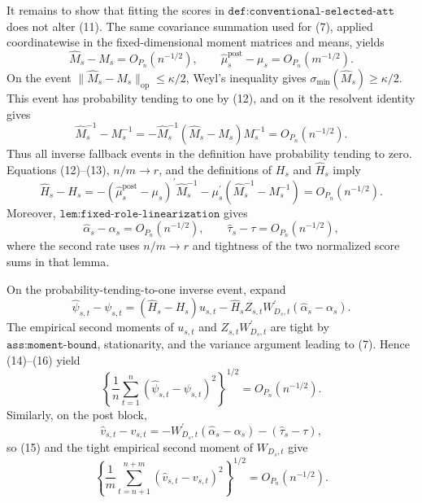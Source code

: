 It remains to show that fitting the scores in \(\texttt{def:conventional-selected-att}\) does not alter (11).  The same covariance summation used for (7), applied coordinatewise in the fixed-dimensional moment matrices and means, yields
\[
 \widehat M_s-M_s=O_{P_n}(n^{-1/2}),
 \qquad
 \widehat\mu_s^{\mathrm{post}}-\mu_s=O_{P_n}(m^{-1/2}).                            \tag{12}
\]
On the event \(\lVert\widehat M_s-M_s\rVert_{\mathrm{op}}\leq\kappa/2\), Weyl's inequality gives \(\sigma_{\min}(\widehat M_s)\geq\kappa/2\).  This event has probability tending to one by (12), and on it the resolvent identity gives
\[
 \widehat M_s^{-1}-M_s^{-1}
 =-\widehat M_s^{-1}(\widehat M_s-M_s)M_s^{-1}
 =O_{P_n}(n^{-1/2}).                                                                 \tag{13}
\]
Thus all inverse fallback events in the definition have probability tending to zero.  Equations (12)--(13), \(n/m\to r\), and the definitions of \(H_s\) and \(\widehat H_s\) imply
\[
 \widehat H_s-H_s
 =-(\widehat\mu_s^{\mathrm{post}}-\mu_s)^{\prime}\widehat M_s^{-1}
   -\mu_s^{\prime}(\widehat M_s^{-1}-M_s^{-1})
 =O_{P_n}(n^{-1/2}).                                                                 \tag{14}
\]
Moreover, \(\texttt{lem:fixed-role-linearization}\) gives
\[
 \widehat\alpha_s-\alpha_s=O_{P_n}(n^{-1/2}),
 \qquad
 \widehat\tau_s-\tau=O_{P_n}(n^{-1/2}),                                            \tag{15}
\]
where the second rate uses \(n/m\to r\) and tightness of the two normalized score sums in that lemma.

On the probability-tending-to-one inverse event, expand
\[
 \widehat\psi_{s,t}-\psi_{s,t}
 =(\widehat H_s-H_s)u_{s,t}
  -\widehat H_sZ_{s,t}W_{D_s,t}^{\prime}(\widehat\alpha_s-\alpha_s).                \tag{16}
\]
The empirical second moments of \(u_{s,t}\) and \(Z_{s,t}W_{D_s,t}^{\prime}\) are tight by \(\texttt{ass:moment-bound}\), stationarity, and the variance argument leading to (7).  Hence (14)--(16) yield
\[
 \left\{\frac1n\sum_{t=1}^n
   (\widehat\psi_{s,t}-\psi_{s,t})^2\right\}^{1/2}
 =O_{P_n}(n^{-1/2}).                                                                 \tag{17}
\]
Similarly, on the post block,
\[
 \widehat v_{s,t}-v_{s,t}
 =-W_{D_s,t}^{\prime}(\widehat\alpha_s-\alpha_s)
   -(\widehat\tau_s-\tau),
\]
so (15) and the tight empirical second moment of \(W_{D_s,t}\) give
\[
 \left\{\frac1m\sum_{t=n+1}^{n+m}
   (\widehat v_{s,t}-v_{s,t})^2\right\}^{1/2}
 =O_{P_n}(n^{-1/2}).                                                                 \tag{18}
\]

